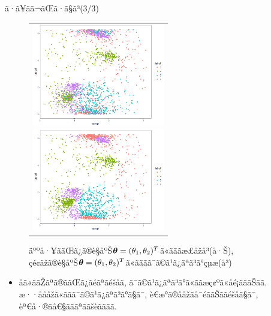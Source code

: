 \documentclass[dvipdfmx]{beamer} %
\newcommand{\bm}[1]{\mbox{\boldmath $#1$}}
\begin{document}
\begin{frame}{ã·ã¥ãã¬ãŒã·ã§ã³(3/3)}

\vspace{-1zh}
\begin{figure}[H]
\begin{tabular}{c}

\begin{minipage}{0.5\hsize}
\begin{center}
\includegraphics[clip,height= 45mm]{data/real.png}
\end{center}
\end{minipage}

\begin{minipage}{0.5\hsize}
\begin{center}
\includegraphics[clip,height= 45mm]{data/pred.png}
\end{center}
\end{minipage}
\end{tabular}
\caption{äººå·¥ããŒã¿ã®è§åºŠ$\bm \theta = (\theta_1, \theta_2)^T$ã«ãããæ£åžå³(å·Š), çé¢äžã®è§åºŠ$\bm \theta = (\theta_1, \theta_2)^T$ã«ãããã¯ã©ã¹ã¿ãªã³ã°çµæ(å³)}
\end{figure}

\begin{itemize}
\item
åã«ããŽãªã®ããŒã¿ãéãªãéšåã, ã¯ã©ã¹ã¿ãªã³ã°ã«ããæç¢ºã«åé¡ãããŠãã. æ··åååžã«ããã¯ã©ã¹ã¿ãªã³ã°ã§ã¯, è€æ°ã®ååžãå¯éããŠããéšåã§ã¯, èª€å·®ãå€§ãããªããšèãããã.
\end{itemize}

\end{frame}
\end{document}
